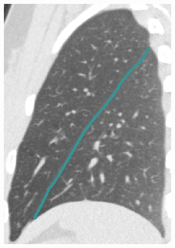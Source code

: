 {\begin{figure}[htbp]
\begin{subfigure}{.25\linewidth}
  \includegraphics[width=\linewidth,trim={{.0\wd0} {.0\wd0} {.0\wd0} {.0\wd0}},clip]{Segmentation/Image/H1335_FRC_PCAFissureDetection_Sagittal.png}
  \caption{}
  \label{fig:HLASegmentationResults-c} 
\end{subfigure}
\begin{subfigure}{.32\linewidth}%

\end{subfigure}
\end{figure}}
